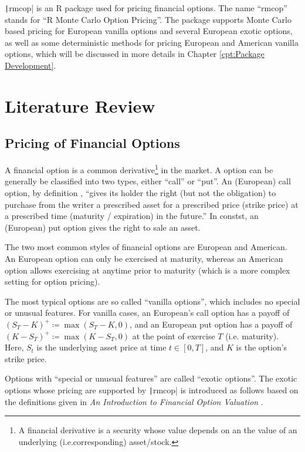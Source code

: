 \texttt|rmcop| is an R package used for pricing financial options. The name ``rmcop'' stands for ``R Monte Carlo Option Pricing''. The package supports Monte Carlo based pricing for European vanilla options and several European exotic options, as well as some deterministic methods for pricing European and American vanilla options, which will be discussed in more details in Chapter \ref{cpt:Package Development}.


\section{Literature Review} \label{sec:Literature Review}

\subsection{Pricing of Financial Options}

A financial option is a common derivative\footnote{A financial derivative is a security whose value depends on an the value of an underlying (i.e.corresponding) asset/stock.} in the market. A option can be generally be classified into two types, either ``call'' or ``put''. An (European) call option, by definition \cite{Higham2004}, ``gives its holder the right (but not the obligation) to purchase from the writer a prescribed asset for a prescribed price (strike price) at a prescribed time (maturity / expiration) in the future.'' In constst, an (European) put option gives the right to sale an asset.

The two most common styles of financial options are European and American. An European option can only be exercised at maturity, whereas an American option allows exercising at anytime prior to maturity (which is a more complex setting for option pricing).

The most typical options are so called ``vanilla options'', which includes no special or unusual features. For vanilla cases, an European's call option has a payoff of $(S_T-K)^+ \coloneqq \max{(S_T-K,0)}$, and an European put option has a payoff of $(K-S_T)^+ \coloneqq \max{(K-S_T,0)}$ \cite{Glasserman2003} at the point of exercise $T$ (i.e. maturity). Here, $S_t$ is the underlying asset price at time $t\in[0,T]$, and $K$ is the option's strike price.

Options with ``special or unusual features'' are called ``exotic options''. The exotic options whose pricing are supported by \texttt|rmcop| is introduced as follows based on the definitions given in \textit{An Introduction to Financial Option Valuation} \cite{Higham2004}.

